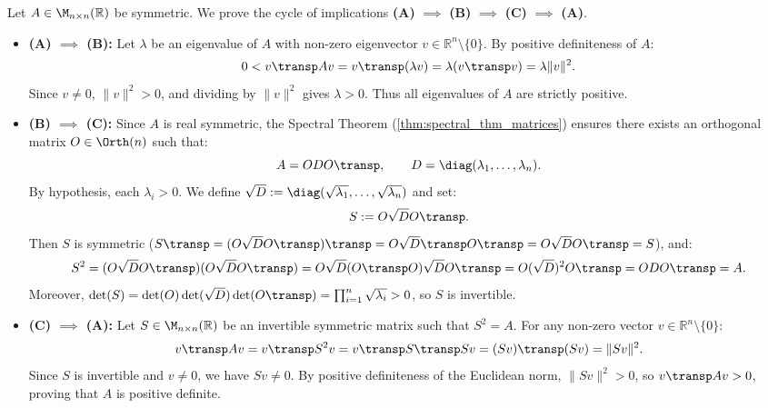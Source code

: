 \begin{exercisesolution}
\label{sol:positive_definite_equivalent_characterizations}
Let $A \in \M_{n \times n}(\mathbb{R})$ be symmetric. We prove the cycle of implications \textbf{(A)} $\implies$ \textbf{(B)} $\implies$ \textbf{(C)} $\implies$ \textbf{(A)}.
\begin{itemize}
    \item \textbf{(A) $\implies$ (B):}
    Let $\lambda$ be an eigenvalue of $A$ with non-zero eigenvector $v \in \mathbb{R}^n \setminus \{0\}$.
    By positive definiteness of $A$:
    \[
    0 < v\transp A v = v\transp (\lambda v) = \lambda (v\transp v) = \lambda \|v\|^2.
    \]
    Since $v \ne 0$, $\|v\|^2 > 0$, and dividing by $\|v\|^2$ gives $\lambda > 0$.
    Thus all eigenvalues of $A$ are strictly positive.

    \item \textbf{(B) $\implies$ (C):}
    Since $A$ is real symmetric, the Spectral Theorem (\cref{thm:spectral_thm_matrices}) ensures there exists an orthogonal matrix $O \in \Orth(n)$ such that:
    \[
    A = O D O\transp, \qquad D = \diag(\lambda_1, \dots, \lambda_n).
    \]
    By hypothesis, each $\lambda_i > 0$. We define $\sqrt{D} := \diag(\sqrt{\lambda_1}, \dots, \sqrt{\lambda_n})$ and set:
    \[
    S := O \sqrt{D} O\transp.
    \]
    Then $S$ is symmetric ($S\transp = (O \sqrt{D} O\transp)\transp = O \sqrt{D}\transp O\transp = O \sqrt{D} O\transp = S$), and:
    \[
    S^2 = (O \sqrt{D} O\transp)(O \sqrt{D} O\transp) = O \sqrt{D} (O\transp O) \sqrt{D} O\transp = O (\sqrt{D})^2 O\transp = O D O\transp = A.
    \]
    Moreover, $\det(S) = \det(O)\det(\sqrt{D})\det(O\transp) = \prod_{i=1}^n \sqrt{\lambda_i} > 0$, so $S$ is invertible.

    \item \textbf{(C) $\implies$ (A):}
    Let $S \in \M_{n \times n}(\mathbb{R})$ be an invertible symmetric matrix such that $S^2 = A$.
    For any non-zero vector $v \in \mathbb{R}^n \setminus \{0\}$:
    \[
    v\transp A v = v\transp S^2 v = v\transp S\transp S v = (Sv)\transp (Sv) = \|Sv\|^2.
    \]
    Since $S$ is invertible and $v \ne 0$, we have $Sv \ne 0$.
    By positive definiteness of the Euclidean norm, $\|Sv\|^2 > 0$, so $v\transp A v > 0$, proving that $A$ is positive definite. \qedhere
\end{itemize}
\end{exercisesolution}
